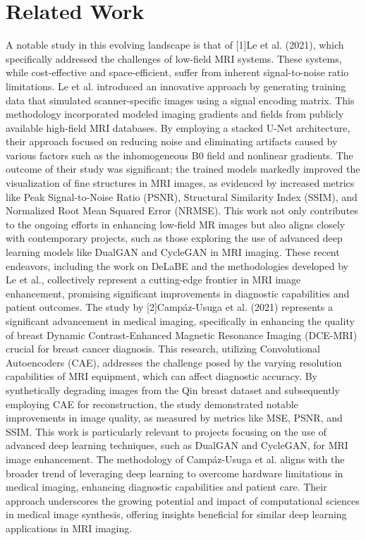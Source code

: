 \documentclass[conference]{IEEEtran}
\begin{document}
\section{Related Work}
A notable study in this evolving landscape is that of [1]Le et al. (2021), which specifically addressed the challenges of low-field MRI systems. These systems, while cost-effective and space-efficient, suffer from inherent signal-to-noise ratio limitations. Le et al. introduced an innovative approach by generating training data that simulated scanner-specific images using a signal encoding matrix. This methodology incorporated modeled imaging gradients and fields from publicly available high-field MRI databases. By employing a stacked U-Net architecture, their approach focused on reducing noise and eliminating artifacts caused by various factors such as the inhomogeneous B0 field and nonlinear gradients. The outcome of their study was significant; the trained models markedly improved the visualization of fine structures in MRI images, as evidenced by increased metrics like Peak Signal-to-Noise Ratio (PSNR), Structural Similarity Index (SSIM), and Normalized Root Mean Squared Error (NRMSE). This work not only contributes to the ongoing efforts in enhancing low-field MR images but also aligns closely with contemporary projects, such as those exploring the use of advanced deep learning models like DualGAN and CycleGAN in MRI imaging. These recent endeavors, including the work on DeLaBE and the methodologies developed by Le et al., collectively represent a cutting-edge frontier in MRI image enhancement, promising significant improvements in diagnostic capabilities and patient outcomes.
The study by [2]Campáz-Usuga et al. (2021) represents a significant advancement in medical imaging, specifically in enhancing the quality of breast Dynamic Contrast-Enhanced Magnetic Resonance Imaging (DCE-MRI) crucial for breast cancer diagnosis. This research, utilizing Convolutional Autoencoders (CAE), addresses the challenge posed by the varying resolution capabilities of MRI equipment, which can affect diagnostic accuracy. By synthetically degrading images from the Qin breast dataset and subsequently employing CAE for reconstruction, the study demonstrated notable improvements in image quality, as measured by metrics like MSE, PSNR, and SSIM.
This work is particularly relevant to projects focusing on the use of advanced deep learning techniques, such as DualGAN and CycleGAN, for MRI image enhancement. The methodology of Campáz-Usuga et al. aligns with the broader trend of leveraging deep learning to overcome hardware limitations in medical imaging, enhancing diagnostic capabilities and patient care. Their approach underscores the growing potential and impact of computational sciences in medical image synthesis, offering insights beneficial for similar deep learning applications in MRI imaging.
\end{document}
